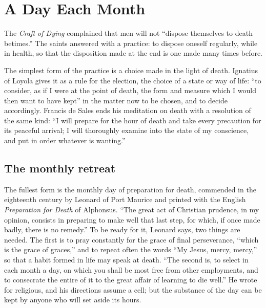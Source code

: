 \section{A Day Each Month}

The \emph{Craft of Dying} complained that men will not ``dispose themselves to death betimes.'' The saints answered with a practice: to dispose oneself regularly, while in health, so that the disposition made at the end is one made many times before.

The simplest form of the practice is a choice made in the light of death. Ignatius of Loyola gives it as a rule for the election, the choice of a state or way of life: ``to consider, as if I were at the point of death, the form and measure which I would then want to have kept'' in the matter now to be chosen, and to decide accordingly. Francis de Sales ends his meditation on death with a resolution of the same kind: ``I will prepare for the hour of death and take every precaution for its peaceful arrival; I will thoroughly examine into the state of my conscience, and put in order whatever is wanting.''

\subsection{The monthly retreat}

The fullest form is the monthly day of preparation for death, commended in the eighteenth century by Leonard of Port Maurice and printed with the English \emph{Preparation for Death} of Alphonsus. ``The great act of Christian prudence, in my opinion, consists in preparing to make well that last step, for which, if once made badly, there is no remedy.'' To be ready for it, Leonard says, two things are needed. The first is to pray constantly for the grace of final perseverance, ``which is the grace of graces,'' and to repeat often the words ``My Jesus, mercy, mercy,'' so that a habit formed in life may speak at death. ``The second is, to select in each month a day, on which you shall be most free from other employments, and to consecrate the entire of it to the great affair of learning to die well.'' He wrote for religious, and his directions assume a cell; but the substance of the day can be kept by anyone who will set aside its hours.

